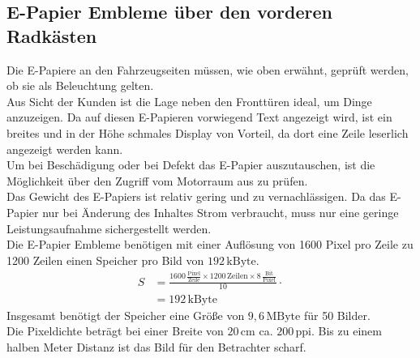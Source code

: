 \subsection{E-Papier Embleme über den vorderen Radkästen}
Die E-Papiere an den Fahrzeugseiten müssen, wie oben erwähnt, geprüft werden, ob sie als Beleuchtung gelten.\\
Aus Sicht der Kunden ist die Lage neben den Fronttüren ideal, um Dinge anzuzeigen.
Da auf diesen E-Papieren vorwiegend Text angezeigt wird, ist ein breites und in der Höhe schmales Display von Vorteil, da dort eine Zeile leserlich angezeigt werden kann. \\
Um bei Beschädigung oder bei Defekt das E-Papier auszutauschen, ist die Möglichkeit über den Zugriff vom Motorraum aus zu prüfen. \\
Das Gewicht des E-Papiers ist relativ gering und zu vernachlässigen.
Da das E-Papier nur bei Änderung des Inhaltes Strom verbraucht, muss nur eine geringe Leistungsaufnahme sichergestellt werden. \\
Die E-Papier Embleme benötigen mit einer Auflösung von 1600 Pixel pro Zeile zu 1200 Zeilen einen Speicher pro Bild von $ 192\,\mathrm{kByte} $.
\begin{align}
	S &= \frac{1600\,\frac{\mathrm{Pixel}}{\mathrm{Zeile}} \times 1200\,\mathrm{Zeilen} \times 8\,\frac{\mathrm{Bit}}{\mathrm{Pixel}}}{10} \cdot \\
	&= 192\,\mathrm{kByte}
\end{align}
Insgesamt benötigt der Speicher eine Größe von $ 9,6\,\mathrm{MByte} $ für 50 Bilder. \\
Die Pixeldichte beträgt bei einer Breite von $ 20\,\mathrm{cm} $ ca. $ 200\,\mathrm{ppi} $. Bis zu einem halben Meter Distanz ist das Bild für den Betrachter scharf.
